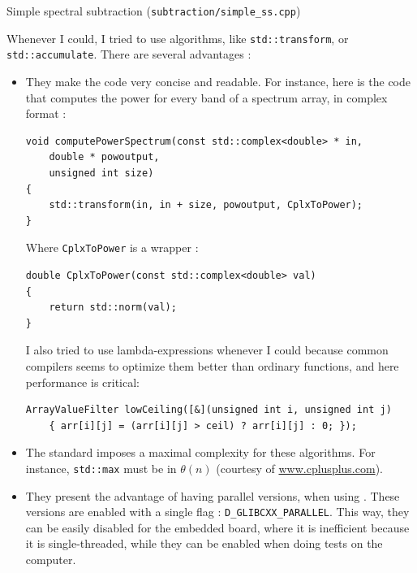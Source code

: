 \begin{algorithm}
 \SetAlgoLined

 \caption{Simple spectral subtraction (\texttt{subtraction/simple\_ss.cpp})}
\end{algorithm}

Whenever I could, I tried to use  algorithms, like \texttt{std::transform}, or \texttt{std::accumulate}.
There are several advantages : 
\begin{itemize}
\item They make the code very concise and readable. For instance, here is the code that computes the power for every band of a spectrum array, in complex format : 
\begin{lstlisting}[caption=math\_util.cpp]
void computePowerSpectrum(const std::complex<double> * in, 
	double * powoutput, 
	unsigned int size)
{
	std::transform(in, in + size, powoutput, CplxToPower);
}
\end{lstlisting}

Where \texttt{CplxToPower} is a wrapper : 
\begin{lstlisting}[caption=math\_util.cpp]
double CplxToPower(const std::complex<double> val)
{
	return std::norm(val);
}
\end{lstlisting}

I also tried to use lambda-expressions whenever I could because common compilers seems to optimize them better than ordinary functions\cite[p.~213]{cppstl}, and here performance is critical:

\begin{lstlisting}[caption=estimation/wavelets/cwt\_wavelet\_estimator.cpp]
ArrayValueFilter lowCeiling([&](unsigned int i, unsigned int j)
	{ arr[i][j] = (arr[i][j] > ceil) ? arr[i][j] : 0; });
\end{lstlisting}


\item The  standard imposes a maximal complexity for these algorithms. For instance, \texttt{std::max} must be in $\theta(n)$ (courtesy of \url{www.cplusplus.com}).
\item They present the advantage of having parallel versions, when using . These versions are enabled with a single  flag : \texttt{D\_GLIBCXX\_PARALLEL}. This way, they can be easily disabled for the embedded board, where it is inefficient because it is single-threaded, while they can be enabled when doing tests on the computer. 
\end{itemize}


